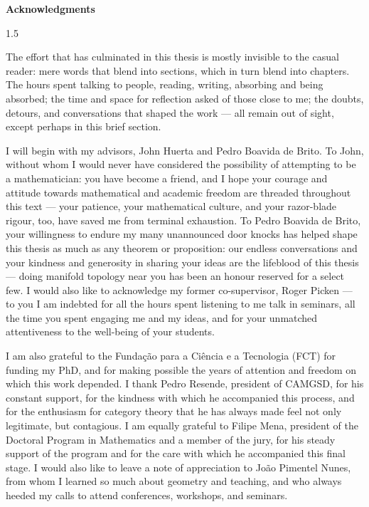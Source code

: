 \documentclass{amsbook}
\newcommand{\fronttitle}[1]{%
  \clearpage
  \phantomsection
  \addcontentsline{toc}{chapter}{#1}%
  {\normalfont\huge\bfseries\noindent #1\par}%
  \vspace{3em}
}
\begin{document}
\fronttitle{Acknowledgments}
\begin{spacing}{1.5}

The effort that has culminated in this thesis is mostly invisible to the casual reader: mere words that blend into sections, which in turn blend into chapters. The hours spent talking to people, reading, writing, absorbing and being absorbed; the time and space for reflection asked of those close to me; the doubts, detours, and conversations that shaped the work — all remain out of sight, except perhaps in this brief section.

I will begin with my advisors, John Huerta and Pedro Boavida de Brito. To John, without whom I would never have considered the possibility of attempting to be a mathematician: you have become a friend, and I hope your courage and attitude towards mathematical and academic freedom are threaded throughout this text — your patience, your mathematical culture, and your razor-blade rigour, too, have saved me from terminal exhaustion. To Pedro Boavida de Brito, your willingness to endure my many unannounced door knocks has helped shape this thesis as much as any theorem or proposition: our endless conversations and your kindness and generosity in sharing your ideas are the lifeblood of this thesis — doing manifold topology near you has been an honour reserved for a select few. I would also like to acknowledge my former co-supervisor, Roger Picken — to you I am indebted for all the hours spent listening to me talk in seminars, all the time you spent engaging me and my ideas, and for your unmatched attentiveness to the well-being of your students.

I am also grateful to the Fundação para a Ciência e a Tecnologia (FCT) for funding my PhD, and for making possible the years of attention and freedom on which this work depended. I thank Pedro Resende, president of CAMGSD, for his constant support, for the kindness with which he accompanied this process, and for the enthusiasm for category theory that he has always made feel not only legitimate, but contagious. I am equally grateful to Filipe Mena, president of the Doctoral Program in Mathematics and a member of the jury, for his steady support of the program and for the care with which he accompanied this final stage. I would also like to leave a note of appreciation to João Pimentel Nunes, from whom I learned so much about geometry and teaching, and who always heeded my calls to attend conferences, workshops, and seminars.


\end{spacing}
\end{document}
